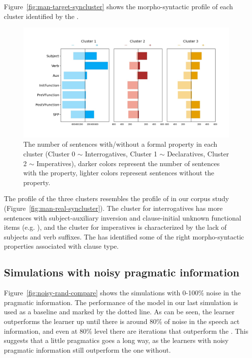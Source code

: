 Figure~\ref{fig:man-target-syncluster} shows the morpho-syntactic profile of each cluster identified by the \plearnerabbr{}. 

\begin{figure}[H]
    \centering
    \includegraphics[width=1\textwidth]{figures/man-target-conservative-syncluster.jpg}
    \caption{The number of sentences with/without a formal property in each cluster (Cluster 0 $\sim$ Interrogatives, Cluster 1 $\sim$ Declaratives, Cluster 2 $\sim$ Imperatives), darker colors represent the number of sentences with the property, lighter colors represent sentences without the property.}
    \label{fig:man-target-conservative-syncluster}
\end{figure}

The profile of the three clusters resembles the profile of \diis{} in our corpus study (Figure~\ref{fig:man-real-syncluster}). The cluster for interrogatives has more sentences with subject-auxiliary inversion and clause-initial unknown functional items (e.g. \twh{}), and the cluster for imperatives is characterized by the lack of subjects and verb suffixes. 
The \plearnerabbr{} has identified some of the right morpho-syntactic properties associated with clause type.

\subsection{Simulations with noisy pragmatic information}
\label{sec:mancl:model:results:noisy}

Figure~\ref{fig:noisy-rand-compare} shows the simulations with 0-100\% noise in the pragmatic information. The performance of the \dlearnerabbr{} model in our last simulation is used as a baseline and marked by the dotted line. As can be seen, the \plearnerabbr{} learner outperforms the \dlearnerabbr{} learner up until there is around 80\% of noise in the speech act information, and even at 80\% level there are iterations that outperform the \dlearnerabbr{}. This suggests that a little pragmatics goes a long way, as the learners with noisy pragmatic information still outperform the one without. 

